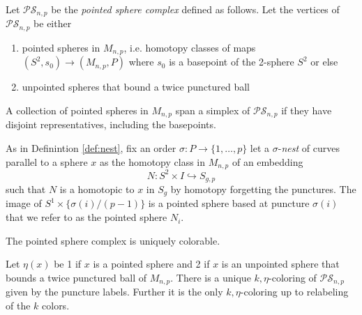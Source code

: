 \begin{definition}
  Let $\mathcal{PS}_{n,p}$
  be the \emph{pointed sphere complex} defined as follows.
  Let the vertices of $\mathcal{PS}_{n,p}$
  be either
  \begin{enumerate}[(1.)]
    \item pointed spheres in $M_{n,p}$, i.e. homotopy classes of maps
    $(S^2,s_0) \to (M_{n,p},P)$ where $s_0$ is a basepoint of the 2-sphere $S^2$ or else
    \item unpointed spheres that bound a twice punctured ball
  \end{enumerate}
  A collection of pointed spheres in $M_{n,p}$ span a simplex
  of $\mathcal{PS}_{n,p}$ if they have disjoint representatives, including the basepoints.
\end{definition}

\begin{definition}
As in Definintion  \ref{def:nest}, fix an order $\sigma: P \to \{1,\ldots, p\}$
let a $\sigma$-\emph{nest} of curves parallel to a sphere $x$
as the homotopy class in $M_{n,p}$
of an embedding
$$N: S^2 \times I \hookrightarrow S_{g,p}$$
such that $N$ is a homotopic to $x$ in $S_g$ by homotopy forgetting the punctures.
The image of $S^1 \times \{{\sigma(i)}/{(p-1)}\}$ is a pointed sphere based at puncture $\sigma(i)$
that we refer to as the pointed sphere $N_i$.
\end{definition}

\begin{lemma}
  The pointed sphere complex is uniquely colorable.

  Let $\eta(x)$ be 1 if $x$ is a pointed sphere and 2 if $x$ is an unpointed sphere that bounds a twice punctured ball of $M_{n,p}$.
  There is a unique $k,\eta$-coloring of $\mathcal {PS}_{n,p}$ given by the puncture labels.
  Further it is the only $k,\eta$-coloring up to relabeling of the $k$ colors.
  \label{lemma:outpaint}
\end{lemma}

